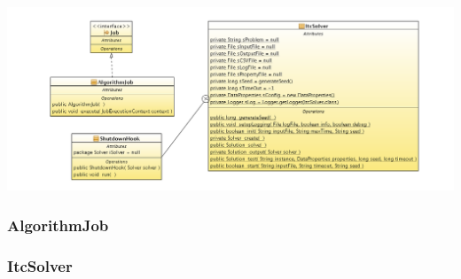 \documentclass[11pt,a4paper]{article}
\begin{document}
\includegraphics[scale=0.34]{images/MMalg_diagram_class.png}
\subsubsection{AlgorithmJob}

\subsubsection{ItcSolver}
\newpage
\end{document}
